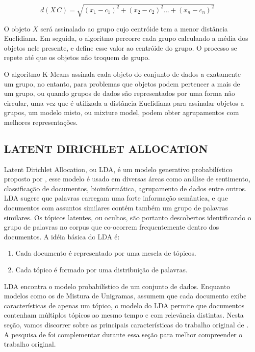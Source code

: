 \documentclass[12pt,a4paper]{article}
\begin{document}
  \begin{equation}
  d(X\,C) = \sqrt{(x_1 - c_1)^2 + (x_2 - c_2)^2 ... + (x_n - c_n)^2}
  \end{equation}
  
  O objeto $X$ será assinalado ao grupo cujo centróide tem a menor distância Euclidiana. Em seguida, o algoritmo percorre cada grupo calculando a média dos objetos nele presente, e define esse valor ao centróide do grupo. O processo se repete até que os objetos não troquem de grupo.
  
  O algoritmo K-Means assinala cada objeto do conjunto de dados a exatamente um grupo, no entanto, para problemas que objetos podem pertencer a mais de um grupo, ou quando grupos de dados são representados por uma forma não circular, uma vez que é  utilizada a distância Euclidiana para assinalar objetos a grupos, um modelo misto, ou mixture model, podem obter agrupamentos com melhores representações.
  
  
  
  \subsection{LATENT DIRICHLET ALLOCATION}
  Latent Dirichlet Allocation, ou LDA, é um modelo generativo probabilístico proposto por , esse modelo é usado em diversas áreas como análise de sentimento, classificação de documentos, bioinformática, agrupamento de dados entre outros. LDA sugere que palavras carregam uma forte informação semântica, e que documentos com assuntos similares contém também um grupo de palavras similares. Os tópicos latentes, ou ocultos, são portanto descobertos identificando o grupo de palavras no corpus que co-ocorrem frequentemente dentro dos documentos. A idéia básica do LDA é:
  
  \begin{enumerate}
    \item Cada documento é representado por uma mescla de tópicos.
    \item Cada tópico é formado por uma distribuição de palavras.
  \end{enumerate}
  
  LDA encontra o modelo probabilístico de um conjunto de dados. Enquanto modelos como os de Mistura de Unigramas, assumem que cada documento exibe características de apenas um tópico, o modelo do LDA  permite que documentos contenham múltiplos tópicos ao mesmo tempo e com relevância distintas. Nesta seção, vamos discorrer sobre as principais características do trabalho original de . A pesquisa de  foi complementar durante essa seção para melhor compreender o trabalho original.
  
\end{document}

